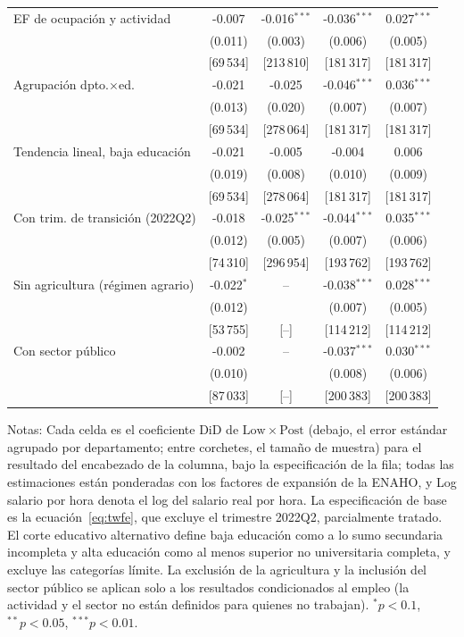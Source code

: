 \begin{table}[!tbp]
\begin{threeparttable}
\begin{tabular}{lcccc}
EF de ocupación y actividad & -0.007 & -0.016$^{***}$ & -0.036$^{***}$ & 0.027$^{***}$ \\
 & (0.011) & (0.003) & (0.006) & (0.005) \\
 & \footnotesize[69\,534] & \footnotesize[213\,810] & \footnotesize[181\,317] & \footnotesize[181\,317] \\
Agrupación dpto.$\times$ed. & -0.021 & -0.025 & -0.046$^{***}$ & 0.036$^{***}$ \\
 & (0.013) & (0.020) & (0.007) & (0.007) \\
 & \footnotesize[69\,534] & \footnotesize[278\,064] & \footnotesize[181\,317] & \footnotesize[181\,317] \\
Tendencia lineal, baja educación & -0.021 & -0.005 & -0.004 & 0.006 \\
 & (0.019) & (0.008) & (0.010) & (0.009) \\
 & \footnotesize[69\,534] & \footnotesize[278\,064] & \footnotesize[181\,317] & \footnotesize[181\,317] \\
Con trim. de transición (2022Q2) & -0.018 & -0.025$^{***}$ & -0.044$^{***}$ & 0.035$^{***}$ \\
 & (0.012) & (0.005) & (0.007) & (0.006) \\
 & \footnotesize[74\,310] & \footnotesize[296\,954] & \footnotesize[193\,762] & \footnotesize[193\,762] \\
Sin agricultura (régimen agrario) & -0.022$^{*}$ & -- & -0.038$^{***}$ & 0.028$^{***}$ \\
 & (0.012) &  & (0.007) & (0.005) \\
 & \footnotesize[53\,755] & \footnotesize[--] & \footnotesize[114\,212] & \footnotesize[114\,212] \\
Con sector público & -0.002 & -- & -0.037$^{***}$ & 0.030$^{***}$ \\
 & (0.010) &  & (0.008) & (0.006) \\
 & \footnotesize[87\,033] & \footnotesize[--] & \footnotesize[200\,383] & \footnotesize[200\,383] \\
\bottomrule
\end{tabular}
\begin{tablenotes}\footnotesize
\item Notas: Cada celda es el coeficiente DiD de $\mathrm{Low}\times\mathrm{Post}$ (debajo, el error estándar agrupado por departamento; entre corchetes, el tamaño de muestra) para el resultado del encabezado de la columna, bajo la especificación de la fila; todas las estimaciones están ponderadas con los factores de expansión de la ENAHO, y Log salario por hora denota el log del salario real por hora. La especificación de base es la ecuación~\eqref{eq:twfe}, que excluye el trimestre 2022Q2, parcialmente tratado. El corte educativo alternativo define baja educación como a lo sumo secundaria incompleta y alta educación como al menos superior no universitaria completa, y excluye las categorías límite. La exclusión de la agricultura y la inclusión del sector público se aplican solo a los resultados condicionados al empleo (la actividad y el sector no están definidos para quienes no trabajan). $^{*}p<0.1$, $^{**}p<0.05$, $^{***}p<0.01$.

\end{tablenotes}
\end{threeparttable}
\end{table}
